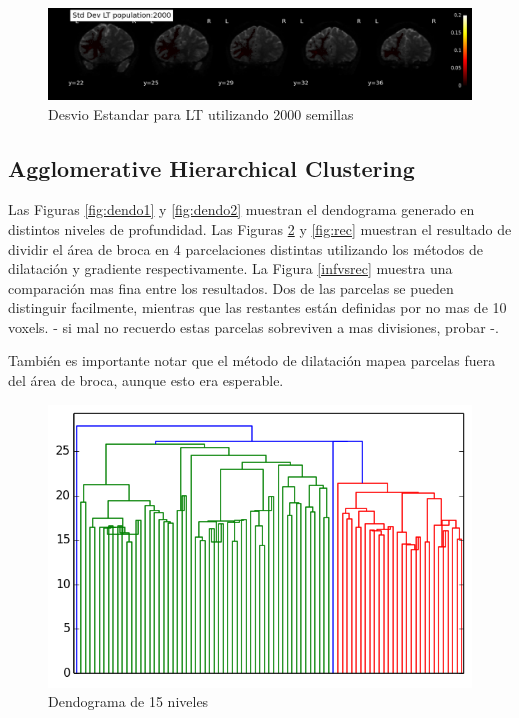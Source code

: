 \begin{figure}[h!]
   \centering
    \includegraphics[width=\textwidth]{img/lt_allstd2.png}
    \caption{Desvio Estandar para LT utilizando 2000 semillas}
    \label{fig:lstd2}
\end{figure}

\subsection{Agglomerative Hierarchical Clustering}

Las Figuras \ref{fig:dendo1} y \ref{fig:dendo2} muestran el dendograma generado
en distintos niveles de profundidad. Las Figuras \ref{fig:infla} y \ref{fig:rec}
muestran el resultado de dividir el \'area de broca en 4 parcelaciones distintas
utilizando los m\'etodos de dilataci\'on y gradiente respectivamente. La Figura
\ref{infvsrec} muestra una comparaci\'on mas fina entre los resultados.  
Dos de las parcelas se pueden distinguir facilmente, mientras que las restantes
est\'an definidas por no mas de 10 voxels. - si mal no recuerdo estas parcelas
sobreviven a mas divisiones, probar -. 

Tambi\'en es importante notar que el m\'etodo de dilataci\'on mapea parcelas
fuera del \'area de broca, aunque esto era esperable.

\begin{figure}[h!]
   \centering
    \includegraphics[width=\textwidth]{img/dendo1.png}
    \caption{Dendograma de 15 niveles}
    \label{fig:infla}
\end{figure}

